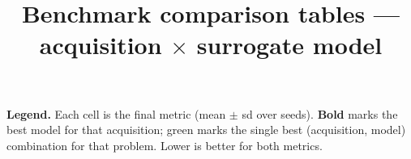\documentclass[11pt]{article}
\title{Benchmark comparison tables --- acquisition $\times$ surrogate model}
\author{}
\date{}
\begin{document}
\maketitle
\noindent\textbf{Legend.} Each cell is the final metric (mean $\pm$ sd over seeds). \textbf{Bold} marks
the best model for that acquisition; \colorbox{green!20}{green} marks the single best (acquisition,
model) combination for that problem. Lower is better for both metrics.
\vspace{1em}

\clearpage

\clearpage

\clearpage

\clearpage

\clearpage

\clearpage
\end{document}
